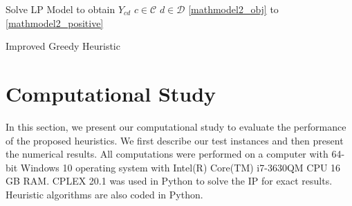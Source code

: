 \documentclass[11pt]{article}
\begin{document}
\begin{singlespace}
\begin{algorithm}[H]
\DontPrintSemicolon
{}

Solve LP Model to obtain $Y_{{c}{d}}$ $c\in\mathcal{C}$ $d\in\mathcal{D}$
\eqref{mathmodel2_obj} to \eqref{mathmodel2_positive}

\caption{Improved Greedy Heuristic}
\label{algo:greedy2}
\end{algorithm}
\end{singlespace}

\newpage
\section{Computational Study} \label{s:num-analysis}

In this section, we present our computational study to evaluate the performance of the proposed heuristics. We first describe our test instances and then present the numerical results. All computations were performed on a computer with 64-bit Windows 10 operating system with Intel(R) Core(TM) i7-3630QM CPU 16 GB RAM. CPLEX 20.1 was used in Python to solve the IP for exact results. Heuristic algorithms are also coded in Python.
\end{document}
